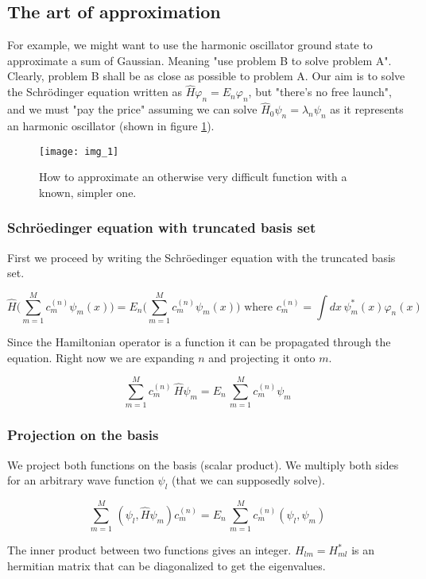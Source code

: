 	\subsection{The art of approximation}
	For example, we might want to use the harmonic oscillator ground state to approximate a sum of Gaussian.
	Meaning "use problem B to solve problem A".
	Clearly, problem B shall be as close as possible to problem A.
	Our aim is to solve the Schr{\"o}dinger equation written as $\hat{H}\varphi_n=E_n\varphi_n$, but "there's no free launch", and we must "pay the price" assuming we can solve $\hat{H}_0\psi_n=\lambda_n\psi_n$ as it represents an harmonic oscillator (shown in figure \ref{fig:approximation}).

	\begin{figure}[htbp!]
	\centering
	\texttt{[image: img\_1]}
	\caption{How to approximate an otherwise very difficult function with a known, simpler one.}
	\label{fig:approximation}
	\end{figure}

		\subsubsection{Schr\"oedinger equation with truncated basis set}
		First we proceed by writing the Schr\"oedinger equation with the truncated basis set.

		$$\hat{H}\bigg(\sum_{m=1}^{M}c_m^{(n)}\psi_m(x)\bigg)=E_n\bigg(\sum_{m=1}^{M}c_m^{(n)}\psi_m(x)\bigg)\text{ where }c_m^{(n)}=\int dx\,\psi_m^*(x)\varphi_n(x)$$

		Since the Hamiltonian operator is a function it can be propagated through the equation.
		Right now we are expanding $n$ and projecting it onto $m$.

		$$\sum_{m=1}^{M}c_m^{(n)}\,\hat{H}\psi_m=E_n\,\sum_{m=1}^{M}c_m^{(n)}\psi_m$$

		\subsubsection{Projection on the basis}
		We project both functions on the basis (scalar product).
		We multiply both sides for an arbitrary wave function $\psi_l$ (that we can supposedly solve).

		$$\sum_{m=1}^{M}\,(\psi_l,\hat{H}\psi_m)c_m^{(n)}=E_n\,\sum_{m=1}^{M}c_m^{(n)}(\psi_l,\psi_m)$$

		The inner product between two functions gives an integer.
		$H_{lm}=H_{ml}^*$ is an hermitian matrix that can be diagonalized to get the eigenvalues.

